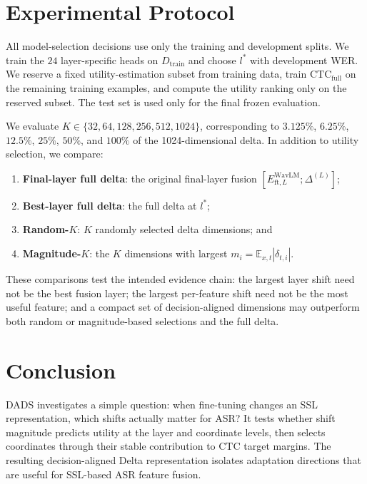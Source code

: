 \documentclass{article}
\begin{document}
\section{Experimental Protocol}
\label{sec:protocol}

All model-selection decisions use only the training and development splits. We train the $24$ layer-specific heads on $D_{\mathrm{train}}$ and choose $l^*$ with development WER. We reserve a fixed utility-estimation subset from training data, train $\mathrm{CTC}_{\mathrm{full}}$ on the remaining training examples, and compute the utility ranking only on the reserved subset. The test set is used only for the final frozen evaluation.

We evaluate $K\in\{32,64,128,256,512,1024\}$, corresponding to $3.125\%$, $6.25\%$, $12.5\%$, $25\%$, $50\%$, and $100\%$ of the 1024-dimensional delta. In addition to utility selection, we compare:
\begin{enumerate}
\item \textbf{Final-layer full delta}: the original final-layer fusion $[E^{\mathrm{WavLM}}_{\mathrm{ft},L};\Delta^{(L)}]$;
\item \textbf{Best-layer full delta}: the full delta at $l^*$;
\item \textbf{Random-$K$}: $K$ randomly selected delta dimensions; and
\item \textbf{Magnitude-$K$}: the $K$ dimensions with largest $m_i=\mathbb{E}_{x,t}|\delta_{t,i}|$.
\end{enumerate}
These comparisons test the intended evidence chain: the largest layer shift need not be the best fusion layer; the largest per-feature shift need not be the most useful feature; and a compact set of decision-aligned dimensions may outperform both random or magnitude-based selections and the full delta.

\section{Conclusion}

DADS investigates a simple question: when fine-tuning changes an SSL representation, which shifts actually matter for ASR? It tests whether shift magnitude predicts utility at the layer and coordinate levels, then selects coordinates through their stable contribution to CTC target margins. The resulting decision-aligned Delta representation isolates adaptation directions that are useful for SSL-based ASR feature fusion.



\end{document}
